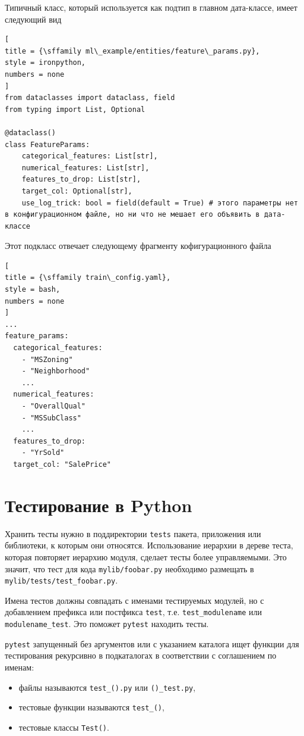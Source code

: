 \documentclass[%
	11pt,
	a4paper,
	utf8,
		]{article}
\begin{document}
Типичный класс, который используется как подтип в главном дата-классе, имеет следующий вид
\begin{lstlisting}[
title = {\sffamily ml\_example/entities/feature\_params.py},
style = ironpython,
numbers = none	
]
from dataclasses import dataclass, field
from typing import List, Optional

@dataclass()
class FeatureParams:
    categorical_features: List[str],
    numerical_features: List[str],
    features_to_drop: List[str],
    target_col: Optional[str],
    use_log_trick: bool = field(default = True) # этого параметры нет в конфигурационном файле, но ни что не мешает его объявить в дата-классе
\end{lstlisting}

Этот подкласс отвечает следующему фрагменту кофигурационного файла
\begin{lstlisting}[
title = {\sffamily train\_config.yaml},
style = bash,
numbers = none	
]
...
feature_params:
  categorical_features:
    - "MSZoning"
    - "Neighborhood"
    ...
  numerical_features:
    - "OverallQual"
    - "MSSubClass"
    ...
  features_to_drop:
    - "YrSold"
  target_col: "SalePrice"
\end{lstlisting}



\section{Тестирование в Python}

Хранить тесты нужно в поддиректории \texttt{tests} пакета, приложения или библиотеки, к которым они относятся. Использование иерархии в дереве теста, которая повторяет иерархию модуля, сделает тесты более управляемыми. Это значит, что тест для кода \texttt{mylib/foobar.py} необходимо размещать в \texttt{mylib/tests/test\_foobar.py}. 

Имена тестов должны совпадать с именами тестируемых модулей, но с добавлением префикса или постфикса \texttt{test}, т.е. \texttt{test\_modulename} или \texttt{modulename\_test}. Это поможет \texttt{pytest} находить тесты.

\texttt{pytest} запущенный без аргументов или с указанием каталога ищет функции для тестирования рекурсивно в подкаталогах в соответствии с соглашением по именам:
\begin{itemize}
	\item файлы называются \texttt{test\_().py} или \texttt{()\_test.py},
	
	\item тестовые функции называются \texttt{test\_()},
	
	\item тестовые классы \texttt{Test()}.
\end{itemize}
\end{document}
